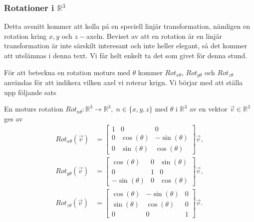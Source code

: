 \documentclass{article}
\theoremstyle{definition}
\begin{document}


\subsubsection{Rotationer i \texorpdfstring{$\mathbb{R}$$^3$}{}}
Detta avsnitt kommer att kolla på en speciell linjär transformation, nämligen en rotation
kring $x, y$ och $z-$axeln. Beviset av att en rotation är en linjär transformation är inte 
särskilt interesant och inte heller elegant, så det kommer att utelämnas i denna text. Vi får 
helt enkelt ta det som givet för denna stund. 

För att beteckna en rotation moturs med $\theta$ 
kommer $Rot_{x\theta}$, $Rot_{y\theta}$ och $Rot_{z\theta}$ användas för att indikera vilken 
axel vi roterar krign.
Vi börjar med att ställa upp följande sats

\begin{mytheo}{}{}
  En moturs rotation $Rot_{n\theta} : \mathbb{R}^3 \rightarrow \mathbb{R}^3, \; n \in \{x, y, z\}$ 
  med $\theta$ i $\mathbb{R}^3$ av en vektor $\vec{v} \in \mathbb{R}^3$ ges av 
  \begin{align}
    Rot_{x\theta} (\vec{v}) &= 
    \begin{bmatrix}
      1 & 0 & 0 \\
      0 & \cos(\theta) & -\sin(\theta) \\
      0 & \sin(\theta) & \cos(\theta)
    \end{bmatrix} \vec{v}, \\
    Rot_{y\theta} (\vec{v}) &= 
    \begin{bmatrix}
      \cos(\theta) & 0 & \sin(\theta) \\
      0 & 1 & 0 \\
      -\sin(\theta) & 0 & \cos(\theta)
    \end{bmatrix} \vec{v}, \\
    Rot_{z\theta} (\vec{v}) &= 
    \begin{bmatrix}
      \cos(\theta) & -\sin(\theta) & 0 \\
      \sin(\theta) & \cos(\theta) & 0 \\
      0 & 0 & 1
    \end{bmatrix} \vec{v}.
  \end{align}
\end{mytheo}
\end{document}
